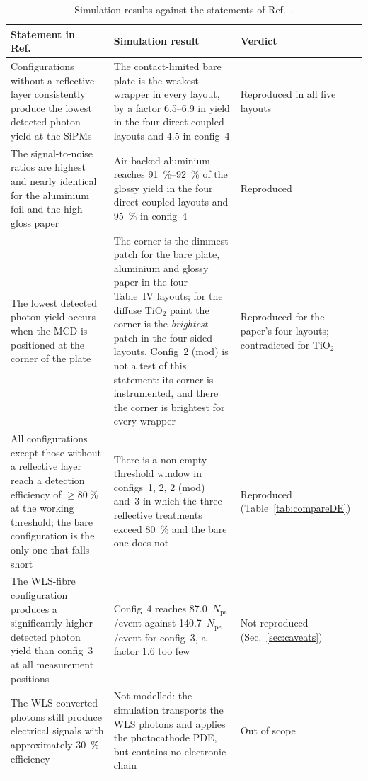 \documentclass[11pt,a4paper]{article}
\newcommand{\pe}{\ensuremath{N_{\mathrm{pe}}}}
\begin{document}
\begin{table}[H]
\centering
\caption{Simulation results against the statements of Ref.~\cite{Rao2025}.}
\label{tab:compare}
\small
{}
\begin{tabularx}{\textwidth}{@{}>{\raggedright\arraybackslash}p{} L L@{}}
\toprule
Statement in Ref.~\cite{Rao2025} & Simulation result & Verdict \\
\midrule
Configurations without a reflective layer consistently produce the lowest
detected photon yield at the SiPMs
&
The contact-limited bare plate is the weakest wrapper in every layout,
by a factor \num{6.5}--\num{6.9} in yield in the four direct-coupled layouts
and \num{4.5} in config~4
&
Reproduced in all five layouts \\
\addlinespace
The signal-to-noise ratios are highest and nearly identical for the aluminium
foil and the high-gloss paper
&
Air-backed aluminium reaches \SIrange{91}{92}{\percent} of the glossy yield
in the four direct-coupled layouts and \SI{95}{\percent} in config~4
&
Reproduced \\
\addlinespace
The lowest detected photon yield occurs when the MCD is positioned at the
corner of the plate
&
The corner is the dimmest patch for the bare plate, aluminium and glossy
paper in the four Table~IV layouts; for the diffuse TiO$_2$ paint the corner
is the \emph{brightest} patch in the four-sided layouts. Config~2 (mod) is not
a test of this statement: its corner is instrumented, and there the corner is
brightest for every wrapper
&
Reproduced for the paper's four layouts; contradicted for TiO$_2$ \\
\addlinespace
All configurations except those without a reflective layer reach a detection
efficiency of $\ge\SI{80}{\percent}$ at the working threshold; the bare
configuration is the only one that falls short
&
There is a non-empty threshold window in configs~1, 2, 2 (mod) and~3 in
which the three reflective treatments exceed \SI{80}{\percent} and the bare one
does not
&
Reproduced (Table~\ref{tab:compareDE}) \\
\addlinespace
The WLS-fibre configuration produces a significantly higher detected photon
yield than config~3 at all measurement positions
&
Config~4 reaches \num{87.0}~\pe/event against \num{140.7}~\pe/event for
config~3, a factor \num{1.6} too few
&
Not reproduced (Sec.~\ref{sec:caveats}) \\
\addlinespace
The WLS-converted photons still produce electrical signals with approximately
\SI{30}{\percent} efficiency
&
Not modelled: the simulation transports the WLS photons and applies the
photocathode PDE, but contains no electronic chain
&
Out of scope \\
\bottomrule
\end{tabularx}
\end{table}
\end{document}
